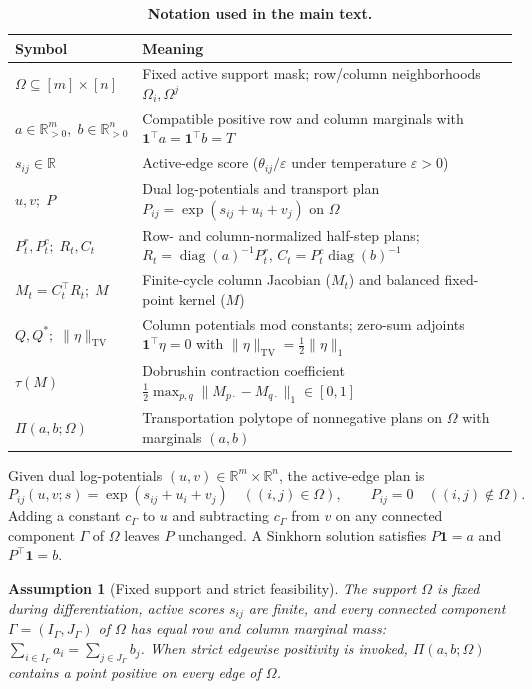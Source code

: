 \documentclass[10pt]{article}
\newtheorem{assumption}{Assumption}
\newcommand{\one}{\mathbf{1}}
\newcommand{\TV}{\mathrm{TV}}
\DeclareMathOperator{\diag}{diag}
\begin{document}
\begin{table}[t]
  \centering
  \small
  \caption{\textbf{Notation used in the main text.}}
  \label{tab:notation}
  \begin{tabular}{@{}ll@{}}
    \toprule
    Symbol & Meaning \\
    \midrule
    $\Omega \subseteq [m]\times[n]$ & Fixed active support mask; row/column neighborhoods $\Omega_i, \Omega^j$ \\
    $a \in \mathbb{R}^m_{>0},\; b \in \mathbb{R}^n_{>0}$ & Compatible positive row and column marginals with $\one^\top a = \one^\top b = T$ \\
    $s_{ij} \in \mathbb{R}$ & Active-edge score ($\theta_{ij}/\varepsilon$ under temperature $\varepsilon > 0$) \\
    $u, v;\; P$ & Dual log-potentials and transport plan $P_{ij} = \exp(s_{ij}+u_i+v_j)$ on $\Omega$ \\
    $P_t^r, P_t^c;\; R_t, C_t$ & Row- and column-normalized half-step plans; $R_t = \diag(a)^{-1}P_t^r$, $C_t = P_t^c\diag(b)^{-1}$ \\
    $M_t = C_t^\top R_t;\; M$ & Finite-cycle column Jacobian ($M_t$) and balanced fixed-point kernel ($M$) \\
    $Q, Q^*;\; \|\eta\|_{\TV}$ & Column potentials mod constants; zero-sum adjoints $\one^\top \eta = 0$ with $\|\eta\|_{\TV} = \frac{1}{2}\|\eta\|_1$ \\
    $\tau(M)$ & Dobrushin contraction coefficient $\frac{1}{2}\max_{p,q}\|M_{p\cdot} - M_{q\cdot}\|_1 \in [0,1]$ \\
    $\Pi(a,b;\Omega)$ & Transportation polytope of nonnegative plans on $\Omega$ with marginals $(a,b)$ \\
    \bottomrule
  \end{tabular}
\end{table}

Given dual log-potentials $(u,v) \in \mathbb{R}^m \times \mathbb{R}^n$, the active-edge plan is
\[
  P_{ij}(u,v;s) = \exp(s_{ij} + u_i + v_j) \quad ((i,j)\in\Omega),
  \qquad P_{ij} = 0 \quad ((i,j)\notin\Omega).
\]
Adding a constant $c_\Gamma$ to $u$ and subtracting $c_\Gamma$ from $v$ on any connected component $\Gamma$ of $\Omega$ leaves $P$ unchanged. A Sinkhorn solution satisfies $P\one = a$ and $P^\top \one = b$.

\begin{assumption}[Fixed support and strict feasibility]
\label{ass:fixed-support-feasible}
The support $\Omega$ is fixed during differentiation, active scores $s_{ij}$ are finite, and every connected component $\Gamma = (I_\Gamma, J_\Gamma)$ of $\Omega$ has equal row and column marginal mass: $\sum_{i \in I_\Gamma} a_i = \sum_{j \in J_\Gamma} b_j$. When strict edgewise positivity is invoked, $\Pi(a,b;\Omega)$ contains a point positive on every edge of $\Omega$.
\end{assumption}
\end{document}
